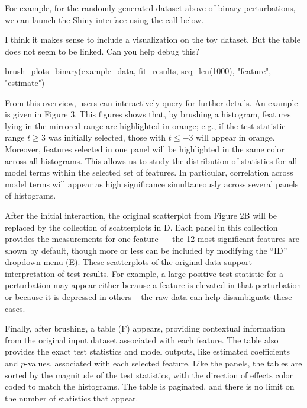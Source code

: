 For example, for the randomly generated dataset above of binary
perturbations, we can launch the Shiny interface using the call below.

\color{violet}

I think it makes sense to include a visualization on the toy dataset.
But the table does not seem to be linked. Can you help debug this?

\begin{Schunk}
\begin{Sinput}
brush_plots_binary(example_data, fit_results, seq_len(1000), "feature", "estimate")
\end{Sinput}
\end{Schunk}

\color{black}

From this overview, users can interactively query for further details.
An example is given in Figure 3. This figures shows that, by brushing a
histogram, features lying in the mirrored range are highlighted in
orange; e.g., if the test statistic range \(t \geq 3\) was initially
selected, those with \(t \leq -3\) will appear in orange. Moreover,
features selected in one panel will be highlighted in the same color
across all histograms. This allows us to study the distribution of
statistics for all model terms within the selected set of features. In
particular, correlation across model terms will appear as high
significance simultaneously across several panels of histograms.

After the initial interaction, the original scatterplot from Figure 2B
will be replaced by the collection of scatterplots in D. Each panel in
this collection provides the measurements for one feature --- the 12
most significant features are shown by default, though more or less can
be included by modifying the ``ID'' dropdown menu (E). These
scatterplots of the original data support interpretation of test
results. For example, a large positive test statistic for a perturbation
may appear either because a feature is elevated in that perturbation or
because it is depressed in others -- the raw data can help disambiguate
these cases.

Finally, after brushing, a table (F) appears, providing contextual
information from the original input dataset associated with each
feature. The table also provides the exact test statistics and model
outputs, like estimated coefficients and \(p\)-values, associated with
each selected feature. Like the panels, the tables are sorted by the
magnitude of the test statistics, with the direction of effects color
coded to match the histograms. The table is paginated, and there is no
limit on the number of statistics that appear.

